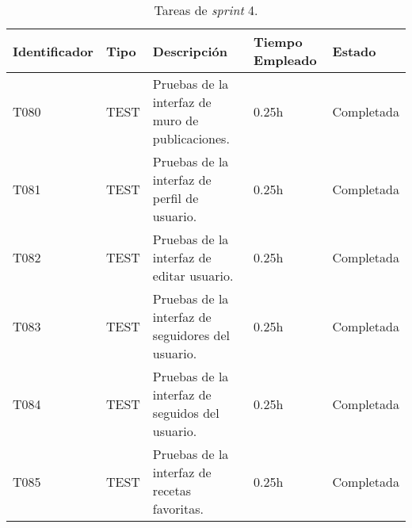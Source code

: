 \begin{table}[]
  \centering
\begin{tabular}{
  |p{}%
  |p{}%
  |p{}
  |p{}
  |p{}
  |%
  }
  \hline
  \textbf{Identificador} & \textbf{Tipo} & \textbf{Descripción}                                             & \textbf{Tiempo Empleado} & \textbf{Estado} \\ \hline
 





  T080                   & TEST           & Pruebas de la interfaz de muro de publicaciones.                   & 0.25h                       & Completada      \\ \hline

  T081                   & TEST           & Pruebas de la interfaz de perfil de usuario.                   & 0.25h                       & Completada      \\ \hline

  T082                   & TEST           & Pruebas de la interfaz de editar usuario.                   & 0.25h                       & Completada      \\ \hline


  T083                   & TEST           & Pruebas de la interfaz de seguidores del usuario.                   & 0.25h                       & Completada      \\ \hline

  T084                   & TEST           & Pruebas de la interfaz de seguidos del usuario.                   & 0.25h                       & Completada      \\ \hline

  T085                   & TEST           & Pruebas de la interfaz de recetas favoritas.                   & 0.25h                       & Completada      \\ \hline
 
 

\end{tabular}
\caption{Tareas de \textit{sprint} 4.}
\label{table:sprint4B}
\end{table}















